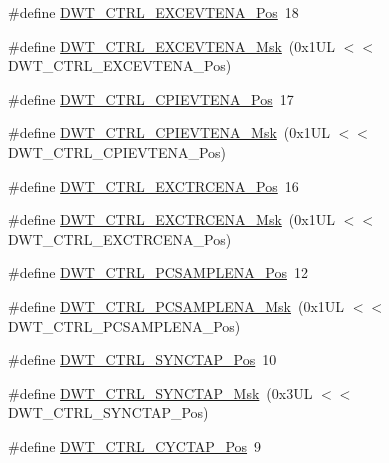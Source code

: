 \begin{DoxyCompactItemize}
\item 
\#define \hyperlink{group___c_m_s_i_s___d_w_t_gaf4e73f548ae3e945ef8b1d9ff1281544}{D\+W\+T\+\_\+\+C\+T\+R\+L\+\_\+\+E\+X\+C\+E\+V\+T\+E\+N\+A\+\_\+\+Pos}~18
\item 
\#define \hyperlink{group___c_m_s_i_s___d_w_t_gab7ee0def33423b5859ca4030dff63b58}{D\+W\+T\+\_\+\+C\+T\+R\+L\+\_\+\+E\+X\+C\+E\+V\+T\+E\+N\+A\+\_\+\+Msk}~(0x1\+U\+L $<$$<$ D\+W\+T\+\_\+\+C\+T\+R\+L\+\_\+\+E\+X\+C\+E\+V\+T\+E\+N\+A\+\_\+\+Pos)
\item 
\#define \hyperlink{group___c_m_s_i_s___d_w_t_ga9fff0b71fb0be1499f5180c6bce1fc8f}{D\+W\+T\+\_\+\+C\+T\+R\+L\+\_\+\+C\+P\+I\+E\+V\+T\+E\+N\+A\+\_\+\+Pos}~17
\item 
\#define \hyperlink{group___c_m_s_i_s___d_w_t_ga189089c30aade60b983df17ad2412f6f}{D\+W\+T\+\_\+\+C\+T\+R\+L\+\_\+\+C\+P\+I\+E\+V\+T\+E\+N\+A\+\_\+\+Msk}~(0x1\+U\+L $<$$<$ D\+W\+T\+\_\+\+C\+T\+R\+L\+\_\+\+C\+P\+I\+E\+V\+T\+E\+N\+A\+\_\+\+Pos)
\item 
\#define \hyperlink{group___c_m_s_i_s___d_w_t_ga05f13b547a9a1e63e003ee0bc6446d0d}{D\+W\+T\+\_\+\+C\+T\+R\+L\+\_\+\+E\+X\+C\+T\+R\+C\+E\+N\+A\+\_\+\+Pos}~16
\item 
\#define \hyperlink{group___c_m_s_i_s___d_w_t_gaf4fbb509ab3cbb768f16484c660a24c3}{D\+W\+T\+\_\+\+C\+T\+R\+L\+\_\+\+E\+X\+C\+T\+R\+C\+E\+N\+A\+\_\+\+Msk}~(0x1\+U\+L $<$$<$ D\+W\+T\+\_\+\+C\+T\+R\+L\+\_\+\+E\+X\+C\+T\+R\+C\+E\+N\+A\+\_\+\+Pos)
\item 
\#define \hyperlink{group___c_m_s_i_s___d_w_t_ga1e14afc7790fcb424fcf619e192554c9}{D\+W\+T\+\_\+\+C\+T\+R\+L\+\_\+\+P\+C\+S\+A\+M\+P\+L\+E\+N\+A\+\_\+\+Pos}~12
\item 
\#define \hyperlink{group___c_m_s_i_s___d_w_t_gafdcf1c86f43fbeaf2780ce797c9ef3d6}{D\+W\+T\+\_\+\+C\+T\+R\+L\+\_\+\+P\+C\+S\+A\+M\+P\+L\+E\+N\+A\+\_\+\+Msk}~(0x1\+U\+L $<$$<$ D\+W\+T\+\_\+\+C\+T\+R\+L\+\_\+\+P\+C\+S\+A\+M\+P\+L\+E\+N\+A\+\_\+\+Pos)
\item 
\#define \hyperlink{group___c_m_s_i_s___d_w_t_ga678ef08786edcbef964479217efb9284}{D\+W\+T\+\_\+\+C\+T\+R\+L\+\_\+\+S\+Y\+N\+C\+T\+A\+P\+\_\+\+Pos}~10
\item 
\#define \hyperlink{group___c_m_s_i_s___d_w_t_gaf1e6c3729d56ecadeb6eeff4d225968c}{D\+W\+T\+\_\+\+C\+T\+R\+L\+\_\+\+S\+Y\+N\+C\+T\+A\+P\+\_\+\+Msk}~(0x3\+U\+L $<$$<$ D\+W\+T\+\_\+\+C\+T\+R\+L\+\_\+\+S\+Y\+N\+C\+T\+A\+P\+\_\+\+Pos)
\item 
\#define \hyperlink{group___c_m_s_i_s___d_w_t_gaf70b80936c7db60bf84fb6dadb8a3559}{D\+W\+T\+\_\+\+C\+T\+R\+L\+\_\+\+C\+Y\+C\+T\+A\+P\+\_\+\+Pos}~9
$$
\end{DoxyCompactItemize}
